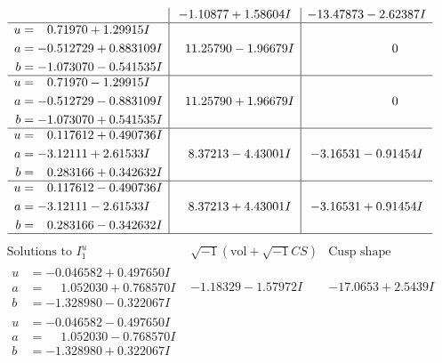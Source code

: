 \documentclass[1p]{elsarticle_modified}
\theoremstyle{definition}
\newcommand{\I}{\sqrt{-1}}
\begin{document}
$$\begin{array}{c|c|c}
 & -1.10877 + 1.58604 I & -13.47873 - 2.62387 I \\ \hline\begin{aligned}
u &= \phantom{-}0.71970 + 1.29915 I \\
a &= -0.512729 + 0.883109 I \\
b &= -1.073070 - 0.541535 I\end{aligned}
 & \phantom{-}11.25790 - 1.96679 I & \phantom{-0.000000 } 0 \\ \hline\begin{aligned}
u &= \phantom{-}0.71970 - 1.29915 I \\
a &= -0.512729 - 0.883109 I \\
b &= -1.073070 + 0.541535 I\end{aligned}
 & \phantom{-}11.25790 + 1.96679 I & \phantom{-0.000000 } 0 \\ \hline\begin{aligned}
u &= \phantom{-}0.117612 + 0.490736 I \\
a &= -3.12111 + 2.61533 I \\
b &= \phantom{-}0.283166 + 0.342632 I\end{aligned}
 & \phantom{-}8.37213 - 4.43001 I & -3.16531 - 0.91454 I \\ \hline\begin{aligned}
u &= \phantom{-}0.117612 - 0.490736 I \\
a &= -3.12111 - 2.61533 I \\
b &= \phantom{-}0.283166 - 0.342632 I\end{aligned}
 & \phantom{-}8.37213 + 4.43001 I & -3.16531 + 0.91454 I\\
 \hline 
 \end{array}$$\newpage$$\begin{array}{c|c|c}  
\text{Solutions to }I^u_{1}& \I (\text{vol} + \sqrt{-1}CS) & \text{Cusp shape}\\
 \hline 
\begin{aligned}
u &= -0.046582 + 0.497650 I \\
a &= \phantom{-}1.052030 + 0.768570 I \\
b &= -1.328980 - 0.322067 I\end{aligned}
 & -1.18329 - 1.57972 I & -17.0653 + 2.5439 I \\ \hline\begin{aligned}
u &= -0.046582 - 0.497650 I \\
a &= \phantom{-}1.052030 - 0.768570 I \\
b &= -1.328980 + 0.322067 I\end{aligned}

\end{array}$$
\end{document}
